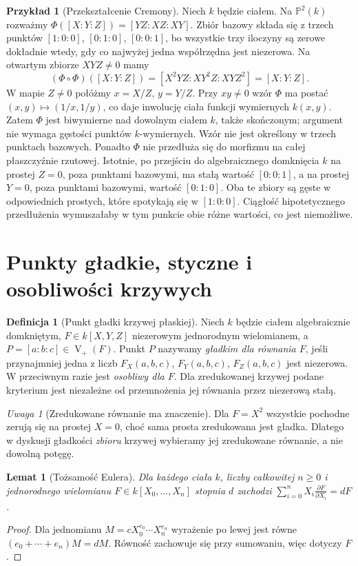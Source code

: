 \documentclass[11pt,a4paper,openany]{report}
\numberwithin{equation}{section}
\theoremstyle{plain}
\newtheorem{lemat}[twierdzenie]{Lemat}
\theoremstyle{definition}
\newtheorem{definicja}[twierdzenie]{Definicja}
\newtheorem{przyklad}[twierdzenie]{Przykład}
\theoremstyle{remark}
\newtheorem{uwaga}[twierdzenie]{Uwaga}
\newcommand{\PP}{\mathbb P}
\newcommand{\V}{\operatorname V}
\begin{document}
\begin{przyklad}[Przekształcenie Cremony]
Niech $k$ będzie ciałem. Na $\PP^2(k)$ rozważmy
$\Phi([X:Y:Z])=[YZ:XZ:XY]$.
Zbiór bazowy składa się z trzech punktów
$[1:0:0]$, $[0:1:0]$, $[0:0:1]$, bo wszystkie trzy iloczyny
są zerowe dokładnie wtedy, gdy co najwyżej jedna współrzędna
jest niezerowa. Na otwartym zbiorze $XYZ\ne0$ mamy
\[
 (\Phi\circ\Phi)([X:Y:Z])
 =[X^2YZ:XY^2Z:XYZ^2]=[X:Y:Z].
\]
W mapie $Z\ne0$ połóżmy $x=X/Z$, $y=Y/Z$.
Przy $xy\ne0$ wzór $\Phi$ ma postać
$(x,y)\mapsto(1/x,1/y)$, co daje inwolucję
ciała funkcji wymiernych $k(x,y)$. Zatem $\Phi$
jest biwymierne nad dowolnym ciałem $k$, także skończonym;
argument nie wymaga gęstości punktów $k$-wymiernych.
Wzór nie jest określony w trzech punktach bazowych.
Ponadto $\Phi$ nie przedłuża się do morfizmu na całej
płaszczyźnie rzutowej. Istotnie, po przejściu do
algebraicznego domknięcia $k$ na prostej $Z=0$,
poza punktami bazowymi, ma stałą wartość $[0:0:1]$,
a na prostej $Y=0$, poza punktami bazowymi, wartość
$[0:1:0]$. Oba te zbiory są gęste w odpowiednich
prostych, które spotykają się w $[1:0:0]$.
Ciągłość hipotetycznego przedłużenia wymuszałaby
w tym punkcie obie różne wartości, co jest niemożliwe.
\end{przyklad}

\section{Punkty gładkie, styczne i osobliwości krzywych}

\begin{definicja}[Punkt gładki krzywej płaskiej]
Niech $k$ będzie ciałem algebraicznie domkniętym,
$F\in k[X,Y,Z]$ niezerowym jednorodnym wielomianem,
a $P=[a:b:c]\in\V_+(F)$. Punkt $P$ nazywamy
\emph{gładkim dla równania $F$}, jeśli przynajmniej jedna
z liczb $F_X(a,b,c)$, $F_Y(a,b,c)$, $F_Z(a,b,c)$ jest
niezerowa. W przeciwnym razie jest \emph{osobliwy dla $F$}.
Dla zredukowanej krzywej podane kryterium jest niezależne
od przemnożenia jej równania przez niezerową stałą.
\end{definicja}

\begin{uwaga}[Zredukowane równanie ma znaczenie]
Dla $F=X^2$ wszystkie pochodne zerują się na prostej $X=0$,
choć sama prosta zredukowana jest gładka.
Dlatego w dyskusji gładkości \emph{zbioru} krzywej wybieramy
jej zredukowane równanie, a nie dowolną potęgę.
\end{uwaga}

\begin{lemat}[Tożsamość Eulera]
Dla każdego ciała $k$, liczby całkowitej $n\ge0$
i jednorodnego wielomianu
$F\in k[X_0,\dots,X_n]$ stopnia $d$ zachodzi
$\sum_{i=0}^nX_i\frac{\partial F}{\partial X_i}=dF$.
\end{lemat}
\begin{proof}
Dla jednomianu $M=cX_0^{e_0}\cdots X_n^{e_n}$
wyrażenie po lewej jest równe
$(e_0+\cdots+e_n)M=dM$.
Równość zachowuje się przy sumowaniu, więc dotyczy $F$.
\end{proof}
\end{document}
